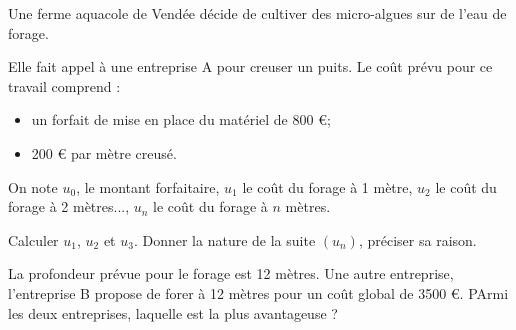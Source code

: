 \documentclass[a4paper,11pt]{exam}
\begin{document}
Une ferme aquacole de Vendée décide de cultiver des micro-algues sur de l'eau de forage.

Elle fait appel à une entreprise A pour creuser un puits. Le coût prévu pour ce travail comprend :
\begin{itemize}
	\item un forfait de mise en place du matériel de 800 €;
	\item 200 € par mètre creusé.	
\end{itemize}

On note $u_0$, le montant forfaitaire, $u_1$ le coût du forage à 1 mètre, $u_2$ le coût du forage à 2 mètres..., $u_n$ le coût du forage à $n$ mètres.
\begin{questions}
	\question Calculer $u_1$, $u_2$ et $u_3$.
	\question Donner la nature de la suite $(u_n)$, préciser sa raison.
	\question
	
	\question La profondeur prévue pour le forage est 12 mètres. Une autre entreprise, l'entreprise B propose de forer à 12 mètres pour un coût global de \num{3500} €. PArmi les deux entreprises, laquelle est la plus avantageuse ?
\end{questions}
	\label{LastPage}
	
\end{document}
